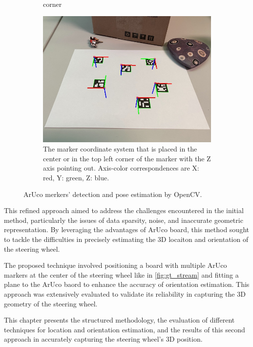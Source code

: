 \begin{figure}[htpb]
\begin{subfigure}[t]{0.3\textwidth}
{        corner}
        \label{fig:marker_detection}
    \end{subfigure}\hfill
    \begin{subfigure}[t]{0.3\textwidth}
        \centering
        \includegraphics[width=\textwidth]{media/chapter 5/singlemarkersaxes.jpg}
        \caption{The marker coordinate system that is placed in the center or in the top left 
        corner of the marker with the Z axis pointing out. 
        Axis-color correspondences are X: red, Y: green, Z: blue.}
        \label{fig:marker_orientation}
    \end{subfigure}
    \caption{ArUco merkers' detection and pose estimation by OpenCV.}
\end{figure}

This refined approach aimed to address the challenges 
encountered in the initial method, particularly the issues of 
data sparsity, noise, and inaccurate geometric representation. 
By leveraging the advantages of ArUco board, this method 
sought to tackle the difficulties in precisely estimating the 
3D locaiton and orientation of the steering wheel. 

The proposed technique involved positioning a board with 
multiple ArUco markers at the center of the steering wheel 
like in \cref{fig:gt_stream} and fitting a plane to the ArUco baord to 
enhance the accuracy of orientation estimation. 
This approach was extensively evaluated to validate its 
reliability in capturing the 3D geometry of the steering wheel.

This chapter presents the structured methodology, the evaluation 
of different techniques for location and orientation estimation, 
and the results of this second approach in accurately capturing 
the steering wheel’s 3D position.

